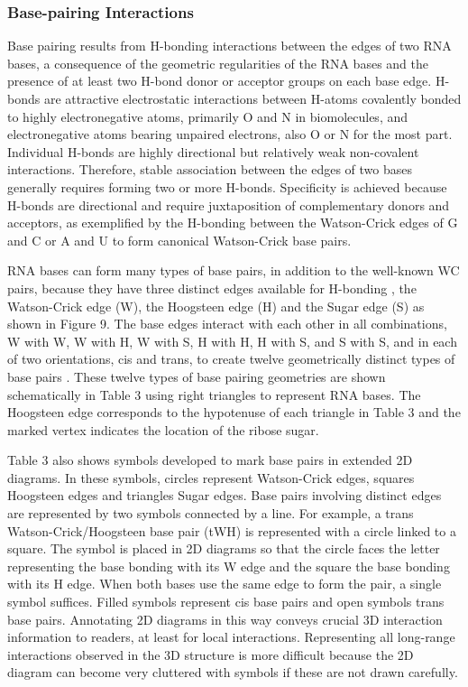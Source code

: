 \subsubsection{Base-pairing Interactions}

Base pairing results from H-bonding interactions between the edges of two RNA
bases, a consequence of the geometric regularities of the RNA bases and the
presence of at least two H-bond donor or acceptor groups on each base edge.
H-bonds are attractive electrostatic interactions between H-atoms covalently
bonded to highly electronegative atoms, primarily O and N in biomolecules, and
electronegative atoms bearing unpaired electrons, also O or N for the most part.
Individual H-bonds are highly directional but relatively weak non-covalent
interactions. Therefore, stable association between the edges of two bases
generally requires forming two or more H-bonds. Specificity is achieved because
H-bonds are directional and require juxtaposition of complementary donors and
acceptors, as exemplified by the H-bonding between the Watson-Crick edges of G
and C or A and U to form canonical Watson-Crick base pairs. 

RNA bases can form many types of base pairs, in addition to the well-known WC
pairs, because they have three distinct edges available for H-bonding
\cite{Leontis2001, Leontis2002f}, the Watson-Crick edge (W), the Hoogsteen edge
(H) and the Sugar edge (S) as shown in Figure 9. The base edges interact with
each other in all combinations, W with W, W with H, W with S, H with H, H with
S, and S with S, and in each of two orientations, cis and trans, to create
twelve geometrically distinct types of base pairs \cite{Leontis2001}. These
twelve types of base pairing geometries are shown schematically in Table 3 using
right triangles to represent RNA bases. The Hoogsteen edge corresponds to the
hypotenuse of each triangle in Table 3 and the marked vertex indicates the
location of the ribose sugar. 

Table 3 also shows symbols developed to mark base pairs in extended 2D diagrams.
In these symbols, circles represent Watson-Crick edges, squares Hoogsteen edges
and triangles Sugar edges. Base pairs involving distinct edges are represented
by two symbols connected by a line. For example, a trans Watson-Crick/Hoogsteen
base pair (tWH) is represented with a circle linked to a square. The symbol is
placed in 2D diagrams so that the circle faces the letter representing the base
bonding with its W edge and the square the base bonding with its H edge. When
both bases use the same edge to form the pair, a single symbol suffices. Filled
symbols represent cis base pairs and open symbols trans base pairs. Annotating
2D diagrams in this way conveys crucial 3D interaction information to readers,
at least for local interactions. Representing all long-range interactions
observed in the 3D structure is more difficult because the 2D diagram can become
very cluttered with symbols if these are not drawn carefully. 


